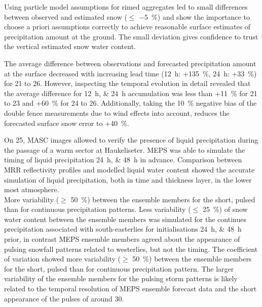 \par\medskip
\noindent
Using particle model assumptions for rimed aggregates led to small differences between observed and estimated snow ($\le$ \SI{-5}{\percent}) and show the importance to choose a priori assumptions correctly to achieve reasonable surface estimates of precipitation amount at the ground. The small deviation gives confidence to trust the vertical estimated snow water content.
\par\medskip
\noindent
The average difference between observations and forecasted precipitation amount at the surface decreased with increasing lead time (\SI{12}{\hour}: +\SI{135}{\percent}, \SI{24}{\hour}: +\SI{33}{\percent}) for \num{21} to \SI{26}{\dec}. However, inspecting the temporal evolution in detail revealed that the average difference for \SIlist{12;24}{\hour} accumulation   was less than +\SI{11}{\percent} for \num{21} to \SI{23}{\dec} and +\SI{60}{\percent} for \num{24} to \SI{26}{\dec}. Additionally, taking the \SI{10}{\percent} negative bias of the double fence measurements due to wind effects into account, reduces the forecasted surface snow error to +\SI{40}{\percent}.
\par\medskip
\noindent
On \SI{25}{\dec}, MASC images allowed to verify the presence of liquid precipitation during the passage of a warm sector at Haukeliseter. MEPS was able to simulate the timing of liquid precipitation \SIlist{24;48}{\hour} in advance. %
Comparison between MRR reflectivity profiles and modelled liquid water content showed the accurate simulation of liquid precipitation, both in time and thickness layer, in the lower most atmosphere. 
\\
More variability ($\ge$ \SI{50}{\percent}) between the ensemble members for the short, pulsed than for continuous precipitation patterns. Less variability ($\le$ \SI{25}{\percent}) of snow water content between the ensemble members was simulated for the continues precipitation associated with south-easterlies for initialisations \SIlist{24;48}{\hour} prior, in contrast MEPS ensemble members agreed about the appearance of pulsing snowfall patterns related to westerlies, but not the timing. 
The coefficient of variation showed more variability ($\ge$ \SI{50}{\percent}) between the ensemble members for the short, pulsed than for continuous precipitation pattern. The larger variability of the ensemble members for the pulsing storm patterns is likely related to the temporal resolution of MEPS ensemble forecast data and the short appearance of the pulses of around \SI{30}{\min}.
